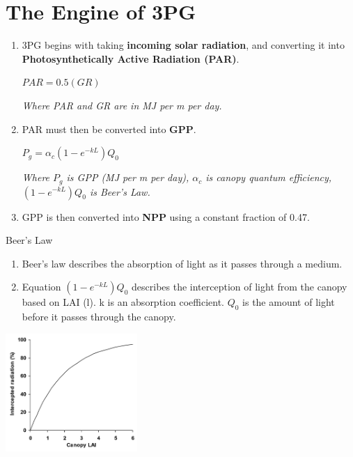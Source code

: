 \documentclass[10pt]{beamer}
\begin{document}
\section{The Engine of 3PG} 
\begin{frame}
\begin{enumerate}
\item 3PG begins with taking \textbf{incoming solar radiation}, and converting it into \textbf{Photosynthetically Active Radiation (PAR)}.
\begin{center}
$PAR = 0.5(GR)$
\end{center}
\begin{center}
\textit{Where PAR and GR are in MJ per m per day.}
\end{center}
\vspace{3mm}
\item PAR must then be converted into \textbf{GPP}.
\begin{center}
$P_g = \alpha_c(1-e^{-kL})Q_0$
\end{center}
\begin{center}
\textit{Where $P_g$ is GPP (MJ per m per day), $\alpha_c$ is canopy quantum efficiency, $(1-e^{-kL})Q_0$ is Beer's Law.}
\end{center}
\vspace{3mm}
\item GPP is then converted into \textbf{NPP} using a constant fraction of 0.47.
\end{enumerate}
\end{frame}

\begin{frame}{Beer's Law}
\begin{enumerate}
\item Beer's law describes the absorption of light as it passes through a medium. 
\item Equation $(1-e^{-kL})Q_0$ describes the interception of light from the canopy based on LAI (l). k is an absorption coefficient. $Q_0$ is the amount of light before it passes through the canopy.   
\end{enumerate}
\begin{center}
\includegraphics[width=5.0cm]{beer.png}    
\end{center}
\end{frame}
\end{document}
